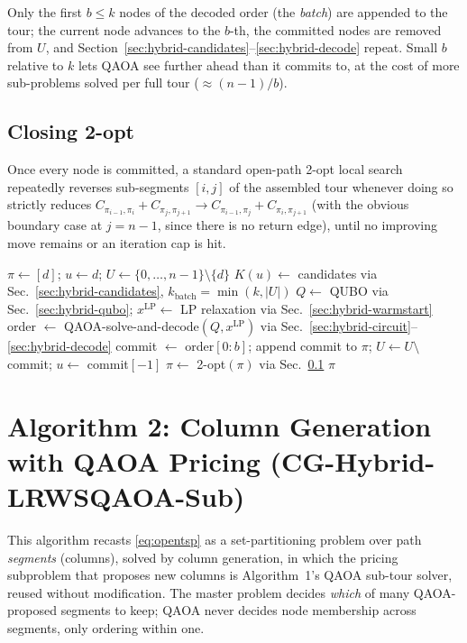 \documentclass[11pt]{article}
\begin{document}
Only the first $b \le k$ nodes of the decoded order (the \emph{batch}) are appended to the tour; the current node advances to the $b$-th, the committed nodes are removed from $U$, and Section~\ref{sec:hybrid-candidates}--\ref{sec:hybrid-decode} repeat. Small $b$ relative to $k$ lets QAOA see further ahead than it commits to, at the cost of more sub-problems solved per full tour ($\approx (n{-}1)/b$).

\subsection{Closing 2-opt}
\label{sec:hybrid-2opt}

Once every node is committed, a standard open-path 2-opt local search repeatedly reverses sub-segments $[i,j]$ of the assembled tour whenever doing so strictly reduces $C_{\pi_{i-1},\pi_i} + C_{\pi_j,\pi_{j+1}} \to C_{\pi_{i-1},\pi_j} + C_{\pi_i,\pi_{j+1}}$ (with the obvious boundary case at $j = n{-}1$, since there is no return edge), until no improving move remains or an iteration cap is hit.

\begin{algorithm}
\caption{WS-LR-QAOA with Receding Horizon (Hybrid 2+5)}
\begin{algorithmic}[1]
\State $\pi \gets [d]$; $u \gets d$; $U \gets \{0,\dots,n-1\}\setminus\{d\}$
  \State $K(u) \gets$ candidates via Sec.~\ref{sec:hybrid-candidates}, $k_{\mathrm{batch}} = \min(k, |U|)$
  \State $Q \gets$ QUBO via Sec.~\ref{sec:hybrid-qubo}; $x^{\mathrm{LP}} \gets$ LP relaxation via Sec.~\ref{sec:hybrid-warmstart}
  \State order $\gets$ QAOA-solve-and-decode$(Q, x^{\mathrm{LP}})$ via Sec.~\ref{sec:hybrid-circuit}--\ref{sec:hybrid-decode}
  \State commit $\gets$ order$[0{:}b]$; append commit to $\pi$; $U \gets U \setminus$ commit; $u \gets$ commit$[-1]$
\EndWhile
\State $\pi \gets$ 2-opt$(\pi)$ via Sec.~\ref{sec:hybrid-2opt}
\State \Return $\pi$
\end{algorithmic}
\end{algorithm}

\section{Algorithm 2: Column Generation with QAOA Pricing (CG-Hybrid-LRWSQAOA-Sub)}
\label{sec:cg}

This algorithm recasts \eqref{eq:opentsp} as a set-partitioning problem over path \emph{segments} (columns), solved by column generation, in which the pricing subproblem that proposes new columns is Algorithm~1's QAOA sub-tour solver, reused without modification. The master problem decides \emph{which} of many QAOA-proposed segments to keep; QAOA never decides node membership across segments, only ordering within one.
\end{document}
